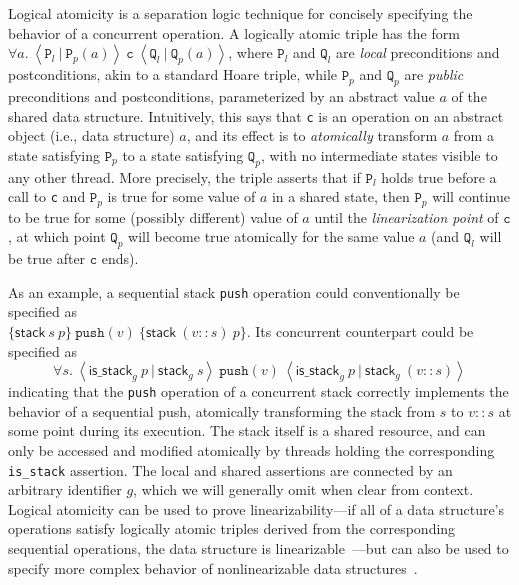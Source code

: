 \documentclass[a4paper,UKenglish,cleveref, autoref, thm-restate]{lipics-v2021}
\begin{document}
Logical atomicity is a separation logic technique for concisely specifying the behavior of a concurrent operation. A logically atomic triple has the form $\forall a.\ \left\langle \texttt{P}_l\ |\ \texttt{P}_p(a) \right\rangle\ \texttt{c}\ \left\langle \texttt{Q}_l\ |\ \texttt{Q}_p(a)\right\rangle$, where $\texttt{P}_l$ and $\texttt{Q}_l$ are \emph{local} preconditions and postconditions, akin to a standard Hoare triple, while $\texttt{P}_p$ and $\texttt{Q}_p$ are \emph{public} preconditions and postconditions, parameterized by an abstract value $a$ of the shared data structure. Intuitively, this says that \lstinline{c} is an operation on an abstract object (i.e., data structure) $a$, and its effect is to \emph{atomically} transform $a$ from a state satisfying $\texttt{P}_p$ to a state satisfying $\texttt{Q}_p$, with no intermediate states visible to any other thread. More precisely, the triple asserts that if $\texttt{P}_l$ holds true before a call to \lstinline{c} and $\texttt{P}_p$ is true for some value of $a$ in a shared state, then $\texttt{P}_p$ will continue to be true for some (possibly different) value of $a$ until the \emph{linearization point} of $\texttt{c}$, at which point $\texttt{Q}_p$ will become true atomically for the same value $a$ (and $\texttt{Q}_l$ will be true after $\texttt{c}$ ends).

As an example, a sequential stack \lstinline{push} operation could conventionally be specified as \\$\{\mathsf{stack}\ s\ p\}\ \texttt{push}(v)\ \{\mathsf{stack}\ (v :: s)\ p\}$. Its concurrent counterpart could be specified as 
$$\forall s.\ \left\langle \mathsf{is\_stack}_g\ p\ |\ \mathsf{stack}_g\ s\right\rangle\ \texttt{push}(v)\ \left\langle \mathsf{is\_stack}_g\ p\ |\ \mathsf{stack}_g\ (v::s)\right\rangle$$
indicating that the \lstinline{push} operation of a concurrent stack correctly implements the behavior of a sequential push, atomically transforming the stack from $s$ to $v::s$ at some point during its execution. The stack itself is a shared resource, and can only be accessed and modified atomically by threads holding the corresponding \texttt{is\_stack} assertion. The local and shared assertions are connected by an arbitrary identifier $g$, which we will generally omit when clear from context. Logical atomicity can be used to prove linearizability---if all of a data structure's operations satisfy logically atomic triples derived from the corresponding sequential operations, the data structure is linearizable~\cite{la-lin}---but can also be used to specify more complex behavior of nonlinearizable data structures~\cite{compass}.
\end{document}
